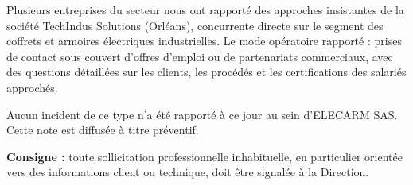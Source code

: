 \documentclass[11pt]{article}
\begin{document}
\lhElecarm
{}

Plusieurs entreprises du secteur nous ont rapporté des approches insistantes de la société TechIndus Solutions (Orléans), concurrente directe sur le segment des coffrets et armoires électriques industrielles. Le mode opératoire rapporté : prises de contact sous couvert d'offres d'emploi ou de partenariats commerciaux, avec des questions détaillées sur les clients, les procédés et les certifications des salariés approchés.

Aucun incident de ce type n'a été rapporté à ce jour au sein d'ELECARM SAS. Cette note est diffusée à titre préventif.

\vspace{10pt}
\begin{quotebox}
\textbf{Consigne :} toute sollicitation professionnelle inhabituelle, en particulier orientée vers des informations client ou technique, doit être signalée à la Direction.
\end{quotebox}
\docfooter
\end{document}

